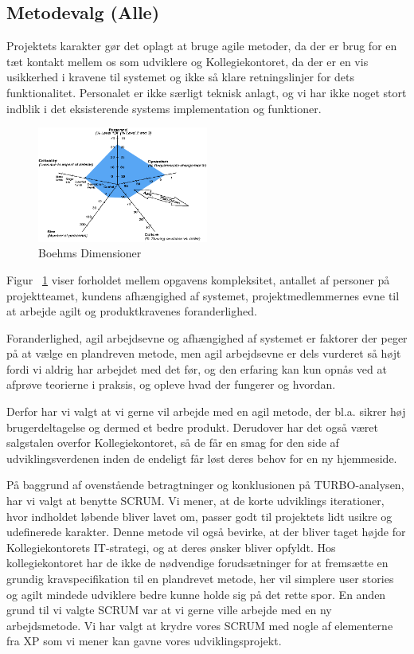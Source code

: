 \documentclass[12pt, a4paper]{report}
\begin{document}
\subsection{Metodevalg (Alle)}

Projektets karakter gør det oplagt at bruge agile metoder, da der er brug for en tæt kontakt mellem os som udviklere og Kollegiekontoret, da der er en vis usikkerhed i kravene til systemet og ikke så klare retningslinjer for dets funktionalitet. Personalet er ikke særligt teknisk anlagt, og vi har ikke noget stort indblik i det eksisterende systems implementation og funktioner.

\begin{figure}[ht]

\centering

\includegraphics[width=0.5\textwidth]{amoebe}

\caption{Boehms Dimensioner}

\label{amoeb}

\end{figure}

Figur ~\ref{amoeb} viser forholdet mellem opgavens kompleksitet, antallet af personer på projektteamet, kundens afhængighed af systemet, projektmedlemmernes evne til at arbejde agilt og produktkravenes foranderlighed.

Foranderlighed, agil arbejdsevne og afhængighed af systemet er faktorer der peger på at vælge en plandreven metode, men agil arbejdsevne er dels vurderet så højt fordi vi aldrig har arbejdet med det før, og den erfaring kan kun opnås ved at afprøve teorierne i praksis, og opleve hvad der fungerer og hvordan.

Derfor har vi valgt at vi gerne vil arbejde med en agil metode, der bl.a. sikrer høj brugerdeltagelse og dermed et bedre produkt. Derudover har det også været salgstalen overfor Kollegiekontoret, så de får en smag for den side af udviklingsverdenen inden de endeligt får løst deres behov for en ny hjemmeside.

På baggrund af ovenstående betragtninger og konklusionen på TURBO-analysen, har vi valgt at benytte SCRUM. Vi mener, at de korte udviklings iterationer, hvor indholdet løbende bliver lavet om, passer godt til projektets lidt usikre og udefinerede karakter.
Denne metode vil også bevirke, at der bliver taget højde for Kollegiekontorets IT-strategi, og at deres ønsker bliver opfyldt. Hos kollegiekontoret har de ikke de nødvendige forudsætninger for at fremsætte en grundig kravspecifikation til en plandrevet metode, her vil simplere user stories og agilt mindede udviklere bedre kunne holde sig på det rette spor.
En anden grund til vi valgte SCRUM var at vi gerne ville arbejde med en ny arbejdsmetode. Vi har valgt at krydre vores SCRUM med nogle af elementerne fra XP som vi mener kan gavne vores udviklingsprojekt.
\end{document}
